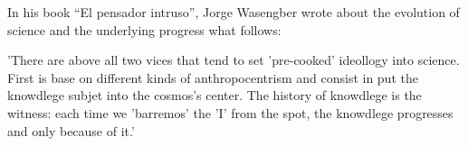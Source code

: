 In his book ``El pensador intruso'', Jorge Wasengber wrote about the evolution of science and the underlying progress what follows: 

'There are above all two vices that tend to set 'pre-cooked' ideollogy into science. First is base on different kinds of anthropocentrism and consist in put the knowdlege subjet into the cosmos's center. The history of knowdlege is the witness: each time we 'barremos' the 'I' from the spot, the knowdlege progresses and only because of it.'


